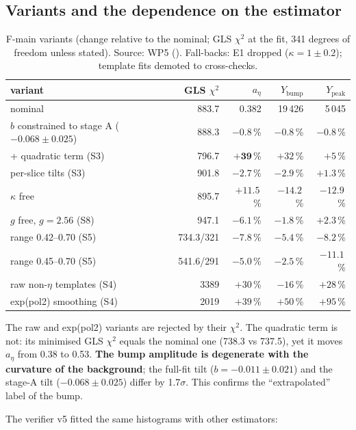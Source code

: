 \documentclass[11pt,a4paper]{article}
\newcommand{\code}[1]{\texttt{\detokenize{#1}}}
\newcommand{\aEta}{\ensuremath{a_\eta}\xspace}
\newcommand{\Ybump}{\ensuremath{Y_{\mathrm{bump}}}\xspace}
\newcommand{\Ypeak}{\ensuremath{Y_{\mathrm{peak}}}\xspace}
\begin{document}
\subsection{Variants and the dependence on the estimator}
\begin{table}[H]
\centering
\caption{F-main variants (change relative to the nominal; GLS $\chi^2$ at the fit, 341 degrees of freedom unless stated). Source: WP5
(\code{wp5_acceptance.txt}). Fall-backs: E1 dropped ($\kappa=1\pm0.2$); template fits demoted to cross-checks.}
\label{tab:fitvar}
\small
\begin{tabular}{@{}l r r r r@{}}
\toprule
variant & GLS $\chi^2$ & \aEta & \Ybump & \Ypeak \\
\midrule
nominal & 883.7 & 0.382 & 19\,426 & 5\,045 \\
$b$ constrained to stage A ($-0.068\pm0.025$) & 888.3 & $-0.8$\,\% & $-0.8$\,\% & $-0.8$\,\% \\
+ quadratic term (S3) & 796.7 & $\mathbf{+39}$\,\% & $+32$\,\% & $+5$\,\% \\
per-slice tilts (S3) & 901.8 & $-2.7$\,\% & $-2.9$\,\% & $+1.3$\,\% \\
$\kappa$ free & 895.7 & $+11.5$\,\% & $-14.2$\,\% & $-12.9$\,\% \\
$g$ free, $g=2.56$ (S8) & 947.1 & $-6.1$\,\% & $-1.8$\,\% & $+2.3$\,\% \\
range 0.42--0.70 (S5) & 734.3/321 & $-7.8$\,\% & $-5.4$\,\% & $-8.2$\,\% \\
range 0.45--0.70 (S5) & 541.6/291 & $-5.0$\,\% & $-2.5$\,\% & $-11.1$\,\% \\
raw non-$\eta$ templates (S4) & 3389 & $+30$\,\% & $-16$\,\% & $+28$\,\% \\
exp(pol2) smoothing (S4) & 2019 & $+39$\,\% & $+50$\,\% & $+95$\,\% \\
\bottomrule
\end{tabular}
\end{table}

The raw and exp(pol2) variants are rejected by their $\chi^2$. The quadratic term is not: its minimised GLS $\chi^2$ equals the nominal one
(738.3 vs 737.5), yet it moves \aEta from 0.38 to 0.53. \textbf{The bump amplitude is degenerate with the curvature of the background}; the
full-fit tilt ($b=-0.011\pm0.021$) and the stage-A tilt ($-0.068\pm0.025$) differ by 1.7$\sigma$. This confirms the ``extrapolated''
label of the bump.

The verifier v5 fitted the same histograms with other estimators:
\end{document}

